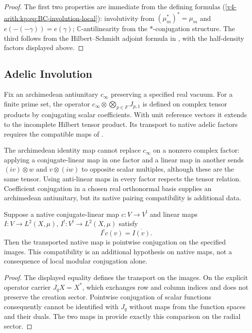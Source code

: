\begin{proof}
The first two properties are immediate from the defining formulas
(\ref{v4-arith:kp:eq:BC-involution-local}): involutivity from
\((\mu_{m}^{*})^{*}=\mu_{m}\) and \(e(-(-\gamma))=e(\gamma)\);
\(\mathbb{C}\)-antilinearity from the \(*\)-conjugation structure.
The third follows from the Hilbert--Schmidt adjoint formula in
, with the half-density
factors displayed above.
\end{proof}

\subsection{Adelic Involution}
\label{v4-arith:kp:BC-involution:adelic}

\begin{definition}
\label{v4-arith:kp:def:adelic-involution}
Fix an archimedean antiunitary $c_\infty$ preserving a specified
real vacuum. For a finite prime set, the operator
$c_\infty\otimes\bigotimes_{p\in F}J_{p,1}$ is defined on
complex tensor products by conjugating scalar coefficients.
With unit reference vectors it extends to the incomplete Hilbert
tensor product. Its transport to native adelic factors requires
the compatible maps of .
\end{definition}

The archimedean identity map cannot replace $c_\infty$ on a
nonzero complex factor: applying a conjugate-linear map in one
factor and a linear map in another sends $(iv)\otimes w$ and
$v\otimes(iw)$ to opposite scalar multiples, although these
are the same tensor. Using anti-linear maps in every factor
respects the tensor relation. Coefficient conjugation in a chosen
real orthonormal basis supplies an archimedean antiunitary, but
its native pairing compatibility is additional data.


\begin{proposition}
\label{v4-arith:kp:prop:involution-conjugation}
Suppose a native conjugate-linear map \(c:V\to V^!\) and linear maps
\(I:V\to L^2(X,\mu)\), \(I^!:V^!\to L^2(X,\mu)\) satisfy
\begin{equation}
              I^!c(v)=\overline{I(v)}.
              \label{v4-arith:kp:eq:involution-conjugation}
\end{equation}
Then the transported native map is pointwise conjugation on the
specified images. This compatibility is an additional hypothesis on
native maps, not a consequence of local modular conjugation alone.
\end{proposition}
\begin{proof}
The displayed equality defines the transport on the images. On the
explicit operator carrier \(J_qX=X^*\), which exchanges row and column
indices and does not preserve the creation sector. Pointwise
conjugation of scalar functions consequently cannot be identified with
\(J_q\) without maps from the function spaces and their duals. The two
maps in  provide exactly
this comparison on the radial sector.
\end{proof}

